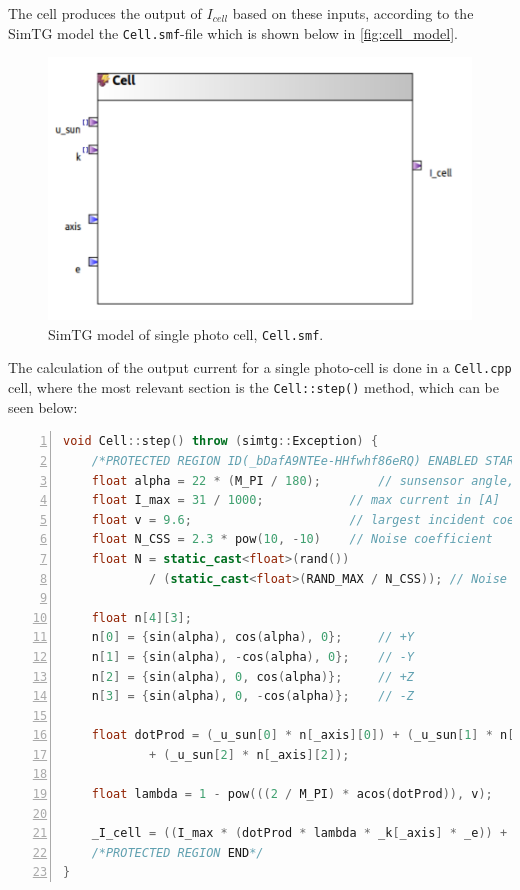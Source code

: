 The cell produces the output of $I_{cell}$ based on these inputs, according to the SimTG model the \texttt{Cell.smf}-file which is shown below in \autoref{fig:cell_model}.

\begin{figure}[H]
    \centering
    \includegraphics[width=0.75\linewidth]{doc//Graphics/cell_model.png}
    \caption{SimTG model of single photo cell, \texttt{Cell.smf}.}
    \label{fig:cell_model}
\end{figure}

\newpage
The calculation of the output current for a single photo-cell is done in a \texttt{Cell.cpp} cell, where the most relevant section is the \texttt{Cell::step()} method, which can be seen below:
\begin{lstlisting}[frame=single,
numbers=left, basicstyle=\tiny, language = C++]
void Cell::step() throw (simtg::Exception) {
	/*PROTECTED REGION ID(_bDafA9NTEe-HHfwhf86eRQ) ENABLED START*/
	float alpha = 22 * (M_PI / 180);		// sunsensor angle, converted to rad
	float I_max = 31 / 1000;			// max current in [A]
	float v = 9.6;						// largest incident coeff [-]
	float N_CSS = 2.3 * pow(10, -10)	// Noise coefficient
	float N = static_cast<float>(rand())
			/ (static_cast<float>(RAND_MAX / N_CSS)); // Noise

	float n[4][3];
	n[0] = {sin(alpha), cos(alpha), 0};		// +Y
	n[1] = {sin(alpha), -cos(alpha), 0};	// -Y
	n[2] = {sin(alpha), 0, cos(alpha)};		// +Z
	n[3] = {sin(alpha), 0, -cos(alpha)};	// -Z

	float dotProd = (_u_sun[0] * n[_axis][0]) + (_u_sun[1] * n[_axis][1])
			+ (_u_sun[2] * n[_axis][2]);

	float lambda = 1 - pow(((2 / M_PI) * acos(dotProd)), v);

	_I_cell = ((I_max * (dotProd * lambda * _k[_axis] * _e)) + N);
	/*PROTECTED REGION END*/
}
\end{lstlisting}
















